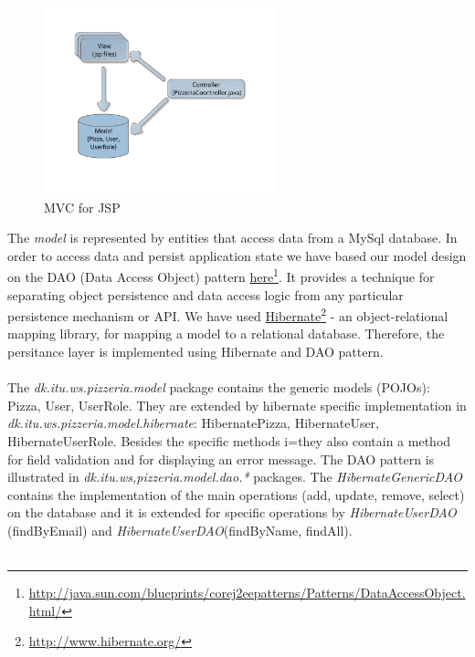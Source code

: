  \begin{figure}[H]
    \begin{center}
        \includegraphics[width=0.6\textwidth]{fig/MVC_JSP.pdf}
        \caption{MVC for JSP}
        \label{fig.MVC_jsp}
    \end{center}
\end{figure}
The \emph{model} is represented by entities that access data from a MySql
database. In order to access data and persist application state we have based our model
design on the DAO (Data Access Object) pattern 
\href{http://java.sun.com/blueprints/corej2eepatterns/Patterns/DataAccessObject.html/}{here}\footnote{\url{http://java.sun.com/blueprints/corej2eepatterns/Patterns/DataAccessObject.html/}}.
It provides a technique for separating
object persistence and data access logic from any particular persistence
mechanism or API. We have used
\href{http://www.hibernate.org/}{Hibernate}\footnote{\url{http://www.hibernate.org/}}
- an object-relational mapping library, for mapping a
model to a relational database. Therefore, the persitance layer is implemented
using Hibernate and DAO pattern.\\\\
The \emph{dk.itu.ws.pizzeria.model} package contains the generic models (POJOs):
Pizza, User, UserRole. They are extended by hibernate specific implementation
in \emph{dk.itu.ws.pizzeria.model.hibernate}: HibernatePizza, HibernateUser,
HibernateUserRole. Besides the specific methods i=they also contain a method
for field validation and for displaying an error message. The DAO pattern is
illustrated in
\emph{dk.itu.ws,pizzeria.model.dao.*} packages. The \emph{HibernateGenericDAO}
contains the implementation of the main operations (add, update, remove, select)
on the database and it is extended for specific operations by
\emph{HibernateUserDAO} (findByEmail) and \emph{HibernateUserDAO}(findByName,
findAll).\\\\
